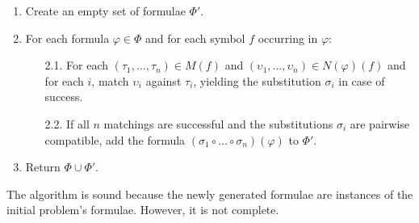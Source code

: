 \documentclass[runningheads]{llncs}
\begin{document}
\begin{enumerate}

   \item Create an empty set of formulae \(\Phi'\).

   \item For each formula \(\varphi \in \Phi\) and for each symbol \(f\) occurring in \(\varphi\):
   \begin{enumerate}
    \item[2.1.] For each \((\tau_1, \dots, \tau_n) \in  M(f)\) and \((\upsilon_1, \dots, \upsilon_n) \in N(\varphi)(f)\) and
     for each \(i\), match \(\upsilon_i\) against \(\tau_i\), yielding the substitution \(\sigma_i\) in case of success.

    \item[2.2.] If all \(n\) matchings are successful and the substitutions \(\sigma_i\) are pairwise compatible,
add the formula \((\sigma_1 \circ \dots \circ \sigma_n)(\varphi)\) to \(\Phi'\).
   \end{enumerate}

   \item Return \(\Phi \cup \Phi'\).

\end{enumerate}

The algorithm is sound because the newly generated formulae are instances of the initial problem's formulae. %
However, it is not complete.
\end{document}
